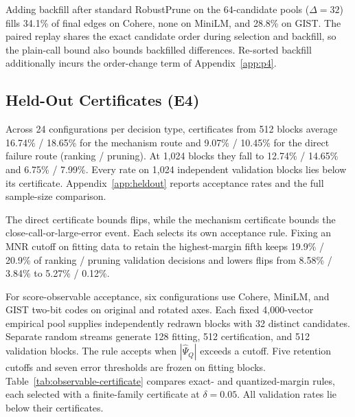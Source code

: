 \documentclass[twoside,11pt]{article}
\begin{document}
Adding backfill after standard RobustPrune on the 64-candidate pools ($\Delta=32$) fills 34.1\% of final edges on Cohere, none on MiniLM, and 28.8\% on GIST. The paired replay shares the exact candidate order during selection and backfill, so the plain-call bound also bounds backfilled differences. Re-sorted backfill additionally incurs the order-change term of Appendix~\ref{app:p4}.

\subsection{Held-Out Certificates (E4)}
\label{sec:exp-certificates}

Across 24 configurations per decision type, certificates from 512 blocks average 16.74\% / 18.65\% for the mechanism route and 9.07\% / 10.45\% for the direct failure route (ranking / pruning). At 1{,}024 blocks they fall to 12.74\% / 14.65\% and 6.75\% / 7.99\%. Every rate on 1{,}024 independent validation blocks lies below its certificate. Appendix~\ref{app:heldout} reports acceptance rates and the full sample-size comparison.



The direct certificate bounds flips, while the mechanism certificate bounds the close-call-or-large-error event. Each selects its own acceptance rule. Fixing an MNR cutoff on fitting data to retain the highest-margin fifth keeps 19.9\% / 20.9\% of ranking / pruning validation decisions and lowers flips from 8.58\% / 3.84\% to 5.27\% / 0.12\%.

For score-observable acceptance, six configurations use Cohere, MiniLM, and GIST two-bit codes on original and rotated axes. Each fixed 4{,}000-vector empirical pool supplies independently redrawn blocks with 32 distinct candidates. Separate random streams generate 128 fitting, 512 certification, and 512 validation blocks. The rule accepts when $|\widehat\Psi_Q|$ exceeds a cutoff. Five retention cutoffs and seven error thresholds are frozen on fitting blocks. Table~\ref{tab:observable-certificate} compares exact- and quantized-margin rules, each selected with a finite-family certificate at $\delta=0.05$. All validation rates lie below their certificates.
\end{document}
